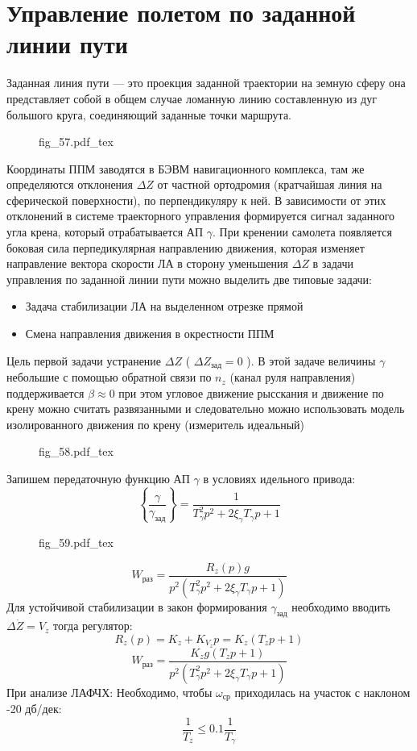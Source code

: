 \documentclass{article}
\newcommand{\incfig}[1]{
    {#1.pdf_tex}
}
\begin{document}
\section{Управление полетом по заданной линии пути}
Заданная линия пути --- это проекция заданной траектории на земную сферу она представляет собой в общем случае ломанную линию составленную из дуг большого круга, соединяющий заданные точки маршрута. 

\begin{figure}[ht]
	\centering
	\incfig{fig_57}
	\label{fig:fig_57}
\end{figure}

Координаты ППМ заводятся в БЭВМ навигационного комплекса, там же определяются отклонения $ \Delta Z$ от частной ортодромия (кратчайшая линия на сферической поверхности), по перпендикуляру к ней. В зависимости от этих отклонений в системе траекторного управления формируется сигнал заданного угла крена, который отрабатывается АП $\gamma$. При кренении самолета появляется боковая сила перпедикулярная направлению движения, которая изменяет направление вектора скорости ЛА в сторону уменьшения $\Delta Z$
в задачи управления по заданной линии пути можно выделить две типовые задачи:
\begin{itemize}
	\item Задача стабилизации ЛА на выделенном отрезке прямой
	\item Смена направления движения в окрестности ППМ
\end{itemize}
Цель первой задачи устранение $ \Delta Z$ ( $\Delta Z_\text{зад} = 0$ ). В этой задаче величины $\gamma$ небольшие с помощью обратной связи по $n_z$ (канал руля направления) поддерживается $\beta \approx 0$ при этом угловое движение рысскания и движение по крену можно считать развязанными и следовательно можно использовать модель изолированного движения по крену (измеритель идеальный)

\begin{figure}[H]
	\centering
	\incfig{fig_58}
	\label{fig:fig_58}
\end{figure}

Запишем передаточную функцию АП $\gamma$ в условиях идельного привода:
\[
	\left\{ \frac{\gamma}{\gamma_\text{зад}} \right\}  = \frac{1}{ T_\gamma^2 p^2 + 2 \xi_\gamma T_\gamma p + 1 }
\]

\begin{figure}[H]
	\centering
	\incfig{fig_59}
	\label{fig:fig_59}
\end{figure}

\[
	W_\text{раз} = \frac{R_z(p)g}{p^2(T_\gamma^2 p^2 + 2 \xi_\gamma T_\gamma p + 1)}
\]
Для устойчивой стабилизации в закон формирования $\gamma_\text{зад}$ необходимо вводить $\Delta \dot{Z} = V_{z}$ тогда регулятор:
\[
	R_z(p) = K_z + K_{V_z} p = K_z(T_z p +1)
\]
\[
	W_\text{раз} = \frac{K_z g(T_z p + 1)}{p^2(T_\gamma^2 p^2 + 2 \xi_\gamma T_\gamma p + 1)}
\]
При анализе ЛАФЧХ: 
Необходимо, чтобы $ \omega_\text{ср}$ приходилась на участок с наклоном -20 дб/дек:
\begin{equation}
	\frac{1}{T_z} \le 0.1 \frac{1}{T_\gamma}
	\label{eq:a2}
\end{equation}
\end{document}
